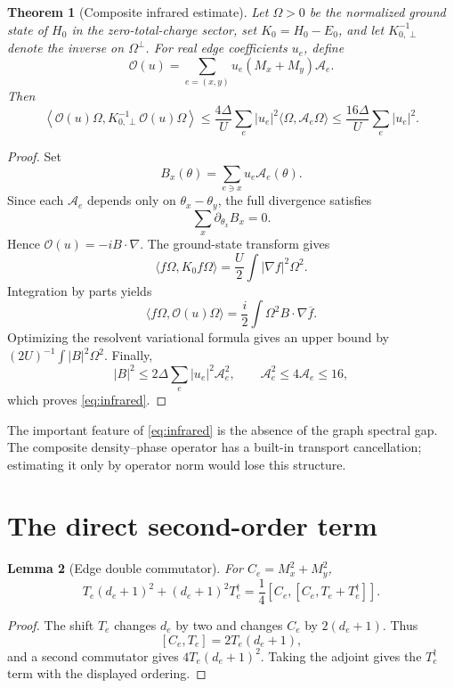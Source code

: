 \documentclass[11pt]{article}
\newtheorem{theorem}{Theorem}[section]
\newtheorem{lemma}[theorem]{Lemma}
\newcommand{\cA}{\mathcal A}
\newcommand{\cO}{\mathcal O}
\begin{document}
\begin{theorem}[Composite infrared estimate]
Let $\Omega>0$ be the normalized ground state of $H_0$ in the zero-total-charge sector, set $K_0=H_0-E_0$, and let $K_{0,\perp}^{-1}$ denote the inverse on $\Omega^\perp$. For real edge coefficients $u_e$, define
\begin{equation}
\cO(u)=\sum_{e=(x,y)}u_e(M_x+M_y)\cA_e.
\label{eq:Ou}
\end{equation}
Then
\begin{equation}
\left\langle \cO(u)\Omega,
K_{0,\perp}^{-1}\cO(u)\Omega\right\rangle
\le \frac{4\Delta}{U}\sum_e|u_e|^2
\langle\Omega,\cA_e\Omega\rangle
\le \frac{16\Delta}{U}\sum_e|u_e|^2.
\label{eq:infrared}
\end{equation}
\end{theorem}

\begin{proof}
Set
\[
B_x(\theta)=\sum_{e\ni x}u_e\cA_e(\theta).
\]
Since each $\cA_e$ depends only on $\theta_x-\theta_y$, the full divergence satisfies
\[
\sum_x\partial_{\theta_x}B_x=0.
\]
Hence $\cO(u)=-iB\cdot\nabla$. The ground-state transform gives
\[
\langle f\Omega,K_0f\Omega\rangle
=\frac U2\int|\nabla f|^2\Omega^2.
\]
Integration by parts yields
\[
\langle f\Omega,\cO(u)\Omega\rangle
=\frac i2\int\Omega^2B\cdot\nabla\overline f.
\]
Optimizing the resolvent variational formula gives an upper bound by $(2U)^{-1}\int|B|^2\Omega^2$. Finally,
\[
|B|^2\le2\Delta\sum_e|u_e|^2\cA_e^2,
\qquad
\cA_e^2\le4\cA_e\le16,
\]
which proves \eqref{eq:infrared}.
\end{proof}

The important feature of \eqref{eq:infrared} is the absence of the graph spectral gap. The composite density--phase operator has a built-in transport cancellation; estimating it only by operator norm would lose this structure.

\section{The direct second-order term}

\begin{lemma}[Edge double commutator]
For $C_e=M_x^2+M_y^2$,
\begin{equation}
T_e(d_e+1)^2+(d_e+1)^2T_e^\dagger
=\frac14[C_e,[C_e,T_e+T_e^\dagger]].
\label{eq:doublecommedge}
\end{equation}
\end{lemma}

\begin{proof}
The shift $T_e$ changes $d_e$ by two and changes $C_e$ by $2(d_e+1)$. Thus
\[
[C_e,T_e]=2T_e(d_e+1),
\]
and a second commutator gives $4T_e(d_e+1)^2$. Taking the adjoint gives the $T_e^\dagger$ term with the displayed ordering.
\end{proof}
\end{document}
